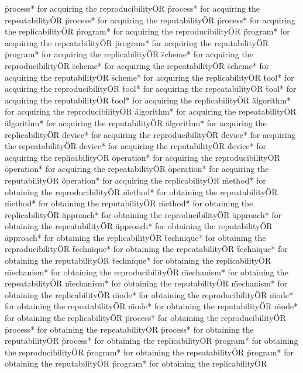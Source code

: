 \documentclass[
10pt, %
a4paper, %
oneside, %
headinclude,footinclude, %
BCOR5mm, %
]{scrartcl}
\begin{document}
\"process* for acquiring the reproducibility\" OR \"process* for acquiring the repeatability\" OR \"process* for acquiring the reputability\" OR \"process* for acquiring the replicability\" OR 
\"program* for acquiring the reproducibility\" OR \"program* for acquiring the repeatability\" OR \"program* for acquiring the reputability\" OR \"program* for acquiring the replicability\" OR 
\"scheme* for acquiring the reproducibility\" OR \"scheme* for acquiring the repeatability\" OR \"scheme* for acquiring the reputability\" OR \"scheme* for acquiring the replicability\" OR 
\"tool* for acquiring the reproducibility\" OR \"tool* for acquiring the repeatability\" OR \"tool* for acquiring the reputability\" OR \"tool* for acquiring the replicability\" OR 
\"algorithm* for acquiring the reproducibility\" OR \"algorithm* for acquiring the repeatability\" OR \"algorithm* for acquiring the reputability\" OR \"algorithm* for acquiring the replicability\" OR 
\"device* for acquiring the reproducibility\" OR \"device* for acquiring the repeatability\" OR \"device* for acquiring the reputability\" OR \"device* for acquiring the replicability\" OR 
\"operation* for acquiring the reproducibility\" OR \"operation* for acquiring the repeatability\" OR \"operation* for acquiring the reputability\" OR \"operation* for acquiring the replicability\" OR 
\"method* for obtaining the reproducibility\" OR \"method* for obtaining the repeatability\" OR \"method* for obtaining the reputability\" OR \"method* for obtaining the replicability\" OR 
\"approach* for obtaining the reproducibility\" OR \"approach* for obtaining the repeatability\" OR \"approach* for obtaining the reputability\" OR \"approach* for obtaining the replicability\" OR 
\"technique* for obtaining the reproducibility\" OR \"technique* for obtaining the repeatability\" OR \"technique* for obtaining the reputability\" OR \"technique* for obtaining the replicability\" OR 
\"mechanism* for obtaining the reproducibility\" OR \"mechanism* for obtaining the repeatability\" OR \"mechanism* for obtaining the reputability\" OR \"mechanism* for obtaining the replicability\" OR 
\"mode* for obtaining the reproducibility\" OR \"mode* for obtaining the repeatability\" OR \"mode* for obtaining the reputability\" OR \"mode* for obtaining the replicability\" OR 
\"process* for obtaining the reproducibility\" OR \"process* for obtaining the repeatability\" OR \"process* for obtaining the reputability\" OR \"process* for obtaining the replicability\" OR 
\"program* for obtaining the reproducibility\" OR \"program* for obtaining the repeatability\" OR \"program* for obtaining the reputability\" OR \"program* for obtaining the replicability\" OR 
\end{document}
